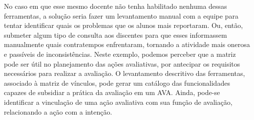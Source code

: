 No caso em que esse mesmo docente não tenha habilitado nenhuma dessas ferramentas, a solução seria fazer um levantamento manual com a equipe para tentar identificar quais os problemas que os alunos mais reportaram. Ou, então, submeter algum tipo de consulta aos discentes para que esses informassem manualmente quais contratempos enfrentaram, tornando a atividade mais onerosa e passíveis de inconsistências. Neste exemplo, podemos perceber que a matriz pode ser útil no planejamento das ações avaliativas, por antecipar os requisitos necessários para realizar a avaliação. O levantamento descritivo das ferramentas, associado à matriz de vínculos, pode gerar um catálogo das funcionalidades capazes de subsidiar a prática da avaliação em um AVA. Ainda, pode-se identificar a vinculação de uma ação avaliativa com sua função de avaliação, relacionando a ação com a intenção. 